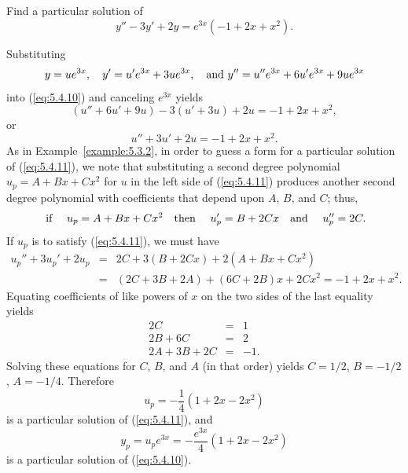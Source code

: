 \setcounter{example}{3}
\setcounter{equation}{9}
\begin{example}
  \label{example:5.4.4} \rm Find a particular solution of
  \begin{equation}
    \label{eq:5.4.10}y''-3y'+2y=e^{3x}(-1+2x+x^{2}).
  \end{equation}
\end{example}
\setcounter{equation}{10}
\begin{examplesolution}
\solution Substituting
\[
  y=ue^{3x},\quad y'=u'e^{3x}+3ue^{3x},\mbox{\quad and }y''=u''e^{3x}+6u'e^{3x}+9ue^{3x}
\]
into (\ref{eq:5.4.10}) and canceling $e^{3x}$ yields
\[
  (u''+6u'+9u)-3(u'+3u)+2u=-1+2x+x^{2},
\]
or
\begin{equation}
  \label{eq:5.4.11}u''+3u'+2u=-1+2x+x^{2}.
\end{equation}
As in Example~\ref{example:5.3.2}, in order to guess a form for a particular solution of
(\ref{eq:5.4.11}), we note that substituting a second degree polynomial $u_{p}=A+Bx+Cx^{2}$ for $u$
in the left side of (\ref{eq:5.4.11}) produces another second degree polynomial with coefficients
that depend upon $A$, $B$, and $C$; thus,
\[
  \mbox{ if \quad}u_{p}=A+Bx+Cx^{2}\mbox{\quad then \quad}u_{p}'=B+2Cx\mbox{\quad and \quad}u_{p}''=2C.
\]
If $u_{p}$ is to satisfy (\ref{eq:5.4.11}), we must have
\begin{eqnarray*}
  u_{p}''+3u_{p}'+2u_{p} & = & 2C+3(B+2Cx)+2(A+Bx+Cx^{2}) \\
                         & = & (2C+3B+2A)+(6C+2B)x+2Cx^{2}=-1+2x+x^{2}.
\end{eqnarray*}
Equating coefficients of like powers of $x$ on the two sides of the last equality yields
\[
  \begin{array}{rcr}
    2C       & = & 1\phantom{.} \\
    2B+6C    & = & 2\phantom{.} \\
    2A+3B+2C & = & -1.
  \end{array}
\]
Solving these equations for $C$, $B$, and $A$ (in that order) yields $C=1/2$, $B=-1/2$, $A=-1/4$.
Therefore
\[
  u_{p}=-\frac{1}{4}(1+2x-2x^{2})
\]
is a particular solution of (\ref{eq:5.4.11}), and
\[
  y_{p}=u_{p}e^{3x}=-\frac{e^{3x}}{4}(1+2x-2x^{2})
\]
is a particular solution of (\ref{eq:5.4.10}).
\end{examplesolution}

